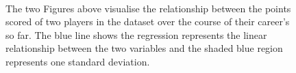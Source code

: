 \documentclass[a4paper,11pt,twoside]{article}
\begin{document}
\begin{figure} [h!]
      \captionsetup{justification=centering}
\\
\caption{The two Figures above visualise the relationship between the points scored of two players in the dataset over the course of their career's so far. The blue line shows the regression represents the linear relationship between the two variables and the shaded blue region represents one standard deviation.}
\end{figure}
\end{document}
